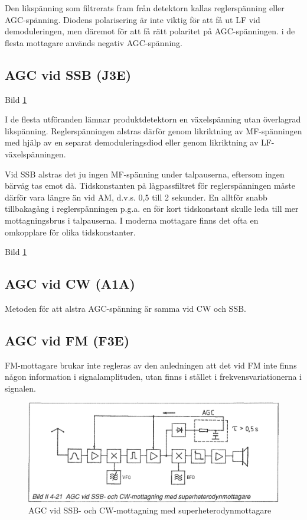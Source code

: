 Den likspänning som filtrerats fram från detektorn kallas
reglerspänning eller AGC-spänning. Diodens polarisering är inte viktig
för att få ut LF vid demoduleringen, men däremot för att få rätt
polaritet på AGC-spänningen. i de flesta mottagare används negativ
AGC-spänning.

\subsection{AGC vid SSB (J3E)}

Bild \ref{fig:bildII4-21}

I de flesta utföranden lämnar produktdetektorn en växelspänning utan
överlagrad likspänning. Reglerspänningen alstras därför genom
likriktning av MF-spänningen med hjälp av en separat demoduleringsdiod
eller genom likriktning av LF-växelspänningen.

Vid SSB alstras det ju ingen MF-spänning under talpauserna, eftersom
ingen bärvåg tas emot då. Tidskonstanten på lågpassfiltret för
reglerspänningen måste därför vara längre än vid AM, d.v.s. 0,5 till 2
sekunder. En alltför snabb tillbakagång i reglerspänningen p.g.a. en
för kort tidskonstant skulle leda till mer mottagningsbrus i talpauserna.
I moderna mottagare finns det ofta en omkopplare för olika
tidskonstanter.

Bild \ref{fig:bildII4-21}

\subsection{AGC vid CW (A1A)}

Metoden för att alstra AGC-spänning är samma vid CW och SSB.

\subsection{AGC vid FM (F3E)}

FM-mottagare brukar inte regleras av den anledningen att det vid FM
inte finns någon information i signalamplituden, utan finns i stället
i frekvensvariationerna i signalen.

\begin{figure}
  \includegraphics[width=\textwidth]{images/bild_2_4-21}
  \caption{AGC vid SSB- och CW-mottagning med superheterodynmottagare}
  \label{fig:bildII4-21}
\end{figure}

